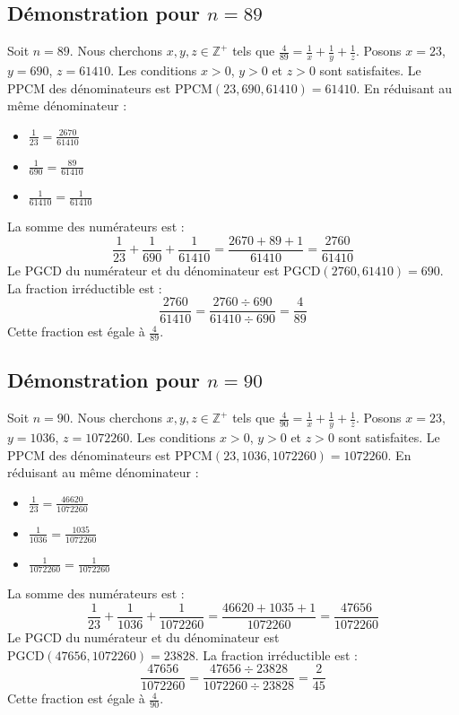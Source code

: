\documentclass[11pt,a4paper]{article}
\begin{document}
\subsection{Démonstration pour $n = 89$}
Soit $n = 89$. Nous cherchons $x, y, z \in \mathbb{Z}^{+}$ tels que $\frac{4}{89} = \frac{1}{x} + \frac{1}{y} + \frac{1}{z}$.
Posons $x = 23$, $y = 690$, $z = 61410$.
Les conditions $x > 0$, $y > 0$ et $z > 0$ sont satisfaites.
Le PPCM des dénominateurs est $\text{PPCM}(23, 690, 61410) = 61410$.
En réduisant au même dénominateur :
\begin{itemize}
    \item $\frac{1}{23} = \frac{2670}{61410}$
    \item $\frac{1}{690} = \frac{89}{61410}$
    \item $\frac{1}{61410} = \frac{1}{61410}$
\end{itemize}
La somme des numérateurs est :
$$ \frac{1}{23} + \frac{1}{690} + \frac{1}{61410} = \frac{2670 + 89 + 1}{61410} = \frac{2760}{61410} $$
Le PGCD du numérateur et du dénominateur est $\text{PGCD}(2760, 61410) = 690$.
La fraction irréductible est :
$$ \frac{2760}{61410} = \frac{2760 \div 690}{61410 \div 690} = \frac{4}{89} $$
Cette fraction est égale à $\frac{4}{89}$.

\subsection{Démonstration pour $n = 90$}
Soit $n = 90$. Nous cherchons $x, y, z \in \mathbb{Z}^{+}$ tels que $\frac{4}{90} = \frac{1}{x} + \frac{1}{y} + \frac{1}{z}$.
Posons $x = 23$, $y = 1036$, $z = 1072260$.
Les conditions $x > 0$, $y > 0$ et $z > 0$ sont satisfaites.
Le PPCM des dénominateurs est $\text{PPCM}(23, 1036, 1072260) = 1072260$.
En réduisant au même dénominateur :
\begin{itemize}
    \item $\frac{1}{23} = \frac{46620}{1072260}$
    \item $\frac{1}{1036} = \frac{1035}{1072260}$
    \item $\frac{1}{1072260} = \frac{1}{1072260}$
\end{itemize}
La somme des numérateurs est :
$$ \frac{1}{23} + \frac{1}{1036} + \frac{1}{1072260} = \frac{46620 + 1035 + 1}{1072260} = \frac{47656}{1072260} $$
Le PGCD du numérateur et du dénominateur est $\text{PGCD}(47656, 1072260) = 23828$.
La fraction irréductible est :
$$ \frac{47656}{1072260} = \frac{47656 \div 23828}{1072260 \div 23828} = \frac{2}{45} $$
Cette fraction est égale à $\frac{4}{90}$.
\end{document}
